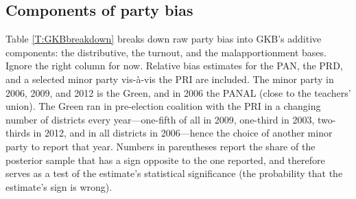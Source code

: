\documentclass[letter,12pt]{article}
\begin{document}
\subsection{Components of party bias}

Table \ref{T:GKBbreakdown} breaks down raw party bias into GKB's additive components: the distributive, the turnout, and the malapportionment bases. Ignore the right column for now. Relative bias estimates for the PAN, the PRD, and a selected minor party vis-\`a-vis the PRI are included. The minor party in 2006, 2009, and 2012 is the Green, and in 2006 the PANAL (close to the teachers' union). The Green ran in pre-election coalition with the PRI in a changing number of districts every year---one-fifth of all in 2009, one-third in 2003, two-thirds in 2012, and in all districts in 2006---hence the choice of another minor party to report that year. Numbers in parentheses report the share of the posterior sample that has a sign opposite to the one reported, and therefore serves as a test of the estimate's statistical significance (the probability that the estimate's sign is wrong). %
\end{document}
